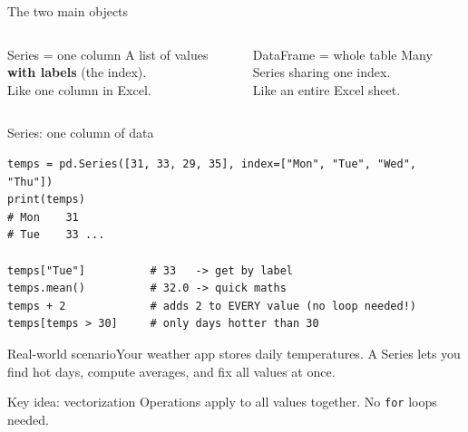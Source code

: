 \documentclass[aspectratio=169,10pt]{beamer}
\newcommand{\code}[1]{\texttt{#1}}
\newcommand{\scenario}[1]{\begin{exampleblock}{Real-world scenario}#1\end{exampleblock}}
\begin{document}
\begin{frame}{The two main objects}
  \begin{columns}[T]
    \begin{block}{Series = one column}
      A list of values \textbf{with labels} (the index).\\[1mm]
      Like one column in Excel.
    \end{block}
    \begin{block}{DataFrame = whole table}
      Many Series sharing one index.\\[1mm]
      Like an entire Excel sheet.
    \end{block}
  \end{columns}
  \vspace{2mm}
  \begin{center}
  \end{center}
\end{frame}

\begin{frame}[fragile]{Series: one column of data}
\begin{lstlisting}
temps = pd.Series([31, 33, 29, 35], index=["Mon", "Tue", "Wed", "Thu"])
print(temps)
# Mon    31
# Tue    33 ...

temps["Tue"]          # 33   -> get by label
temps.mean()          # 32.0 -> quick maths
temps + 2             # adds 2 to EVERY value (no loop needed!)
temps[temps > 30]     # only days hotter than 30
\end{lstlisting}
  \scenario{Your weather app stores daily temperatures. A Series lets you find hot days,
  compute averages, and fix all values at once.}
  \begin{block}{Key idea: vectorization}
    Operations apply to \alert{all values together}. No \code{for} loops needed.
  \end{block}
\end{frame}
\end{document}
